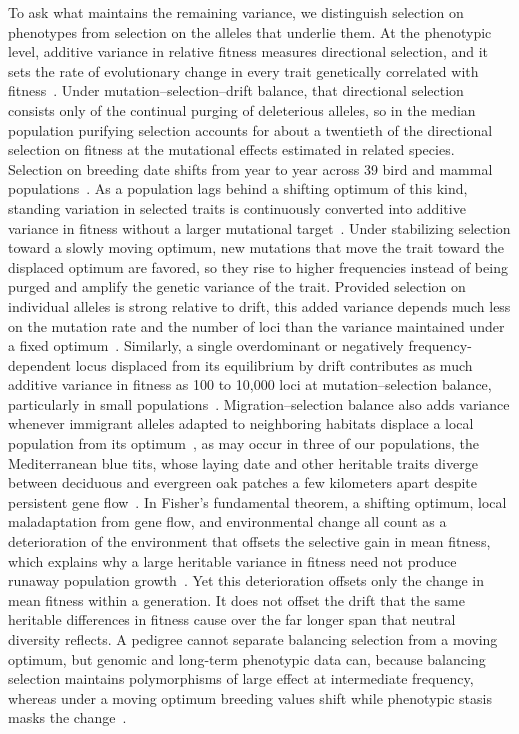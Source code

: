 \documentclass{article}
\begin{document}
To ask what maintains the remaining variance, we distinguish selection on phenotypes from selection on the alleles that underlie them. At the phenotypic level, additive variance in relative fitness measures directional selection, and it sets the rate of evolutionary change in every trait genetically correlated with fitness~\cite{robertson1966,price1970,morrissey2010}. Under mutation--selection--drift balance, that directional selection consists only of the continual purging of deleterious alleles, so in the median population purifying selection accounts for about a twentieth of the directional selection on fitness at the mutational effects estimated in related species. Selection on breeding date shifts from year to year across 39 bird and mammal populations~\cite{devillemereuil2020}. As a population lags behind a shifting optimum of this kind, standing variation in selected traits is continuously converted into additive variance in fitness without a larger mutational target~\cite{burger1995,lande1996}. Under stabilizing selection toward a slowly moving optimum, new mutations that move the trait toward the displaced optimum are favored, so they rise to higher frequencies instead of being purged and amplify the genetic variance of the trait. Provided selection on individual alleles is strong relative to drift, this added variance depends much less on the mutation rate and the number of loci than the variance maintained under a fixed optimum~\cite{bertram2026}. Similarly, a single overdominant or negatively frequency-dependent locus displaced from its equilibrium by drift contributes as much additive variance in fitness as 100 to 10,000 loci at mutation--selection balance, particularly in small populations~\cite{connallon2026}. Migration--selection balance also adds variance whenever immigrant alleles adapted to neighboring habitats displace a local population from its optimum~\cite{lenormand2002}, as may occur in three of our populations, the Mediterranean blue tits, whose laying date and other heritable traits diverge between deciduous and evergreen oak patches a few kilometers apart despite persistent gene flow~\cite{charmantier2016,perrier2020}. In Fisher's fundamental theorem, a shifting optimum, local maladaptation from gene flow, and environmental change all count as a deterioration of the environment that offsets the selective gain in mean fitness, which explains why a large heritable variance in fitness need not produce runaway population growth~\cite{burt1995,hendry2018,bonnet2022}. Yet this deterioration offsets only the change in mean fitness within a generation. It does not offset the drift that the same heritable differences in fitness cause over the far longer span that neutral diversity reflects. A pedigree cannot separate balancing selection from a moving optimum, but genomic and long-term phenotypic data can, because balancing selection maintains polymorphisms of large effect at intermediate frequency, whereas under a moving optimum breeding values shift while phenotypic stasis masks the change~\cite{merila2001}.
\end{document}
